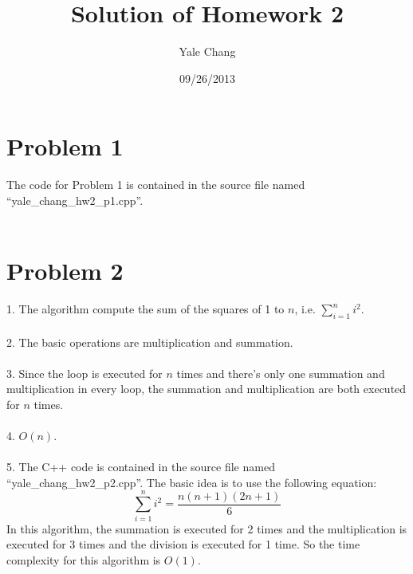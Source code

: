 \documentclass[11pt]{article}
\title{\textbf{Solution of Homework 2}}
\author{Yale Chang}
\date{09/26/2013}
\begin{document}
\maketitle

\section{Problem 1}
The code for Problem 1 is contained in the source file named ``yale\_chang\_hw2\_p1.cpp''.\\
\\

\section{Problem 2}
1. The algorithm compute the sum of the squares of 1 to $n$, i.e. $\sum_{i=1}^{n}i^2$.\\
\\
2. The basic operations are multiplication and summation.\\
\\
3. Since the loop is executed for $n$ times and there's only one summation and multiplication in every loop, the summation and multiplication are both executed for $n$ times.\\
\\
4. $O(n)$.\\
\\
5. The C++ code is contained in the source file named ``yale\_chang\_hw2\_p2.cpp''. The basic idea is to use the following equation:
\begin{equation*}
	\sum_{i=1}^{n}i^2 = \frac{n(n+1)(2n+1)}{6}
\end{equation*}
In this algorithm, the summation is executed for 2 times and the multiplication is executed for 3 times and the division is executed for 1 time. So the time complexity for this algorithm is $O(1)$.
\end{document}
